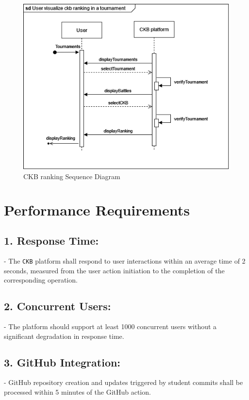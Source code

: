 \begin{center}
    \begin{figure} [H]
        \begin{center}
            \includegraphics[width=0.9\linewidth]{Images/SequenceDiagrams/SD_19.png}
            \caption{CKB ranking Sequence Diagram}
            \label{fig: ckb_ranking_seq_diag}
        \end{center}
    \end{figure}
\end{center}

\newpage
\section{Performance Requirements}
\label{subsec:performance_requirements}%

\subsection*{1. Response Time:}
   - The \verb|CKB| platform shall respond to user interactions within an average time of 2 seconds, measured from the user action initiation to the completion of the corresponding operation.

\subsection*{2. Concurrent Users:}
   - The platform should support at least 1000 concurrent users without a significant degradation in response time.

\subsection*{3. GitHub Integration:}
   - GitHub repository creation and updates triggered by student commits shall be processed within 5 minutes of the GitHub action.

